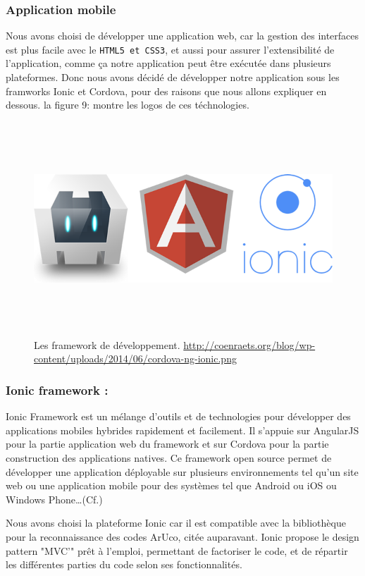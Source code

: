 \documentclass[12pt,a4paper]{article}
\begin{document}
\subsubsection{Application mobile}
Nous avons choisi de développer une application web, car la gestion des interfaces est plus facile avec le \texttt{HTML5 et CSS3}, et aussi pour assurer l'extensibilité de l'application, comme ça notre application peut être exécutée dans plusieurs plateformes. Donc nous avons décidé de développer notre application sous les framworks Ionic et Cordova, pour des raisons que nous allons expliquer en dessous. la figure 9: montre les logos de ces téchnologies.
\begin{figure}[h!]
\centering
	\includegraphics[width = 16cm,height=8cm]{cordova-ng-ionic.png}
    \caption{Les framework de développement. \href{url}{http://coenraets.org/blog/wp-content/uploads/2014/06/cordova-ng-ionic.png}} 
	\label{label-ionic}
\end{figure}

\subsubsection*{Ionic framework :}
Ionic Framework est un mélange d’outils et de technologies pour développer des applications mobiles hybrides rapidement et facilement. Il s’appuie sur AngularJS pour la partie application web du framework et sur Cordova  pour la partie construction des applications natives. Ce framework open source permet de développer une application déployable sur plusieurs environnements tel qu’un site web ou une application mobile pour des systèmes tel que Android ou iOS ou Windows Phone…(Cf.\cite{Ref19})\par 
Nous avons choisi la plateforme Ionic car il est compatible avec la bibliothèque pour la reconnaissance des codes ArUco, citée auparavant. Ionic propose le design pattern "MVC'" prêt à l'emploi, permettant de factoriser le code, et de répartir les différentes parties du code selon ses fonctionnalités.
\end{document}
